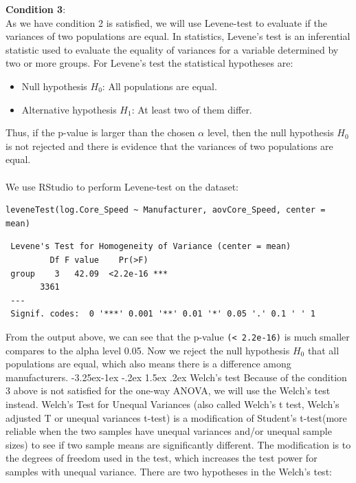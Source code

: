 \documentclass[a4paper]{article}
\makeatletter
\newcounter {subsubsubsection}[subsubsection]
\newcommand\subsubsubsection{\@startsection{subsubsubsection}{4}{\z@}%
                                     {-3.25ex\@plus -1ex \@minus -.2ex}%
                                     {1.5ex \@plus .2ex}%
                                     {\normalfont\normalsize\bfseries}}
\makeatother
\begin{document}
\textbf{Condition 3}:\\
As we have condition 2 is satisfied, we will use Levene-test to evaluate if the variances of two populations are equal. In statistics, Levene’s test is an inferential statistic used to evaluate the equality of variances for a variable determined by two or more groups. For Levene’s test the statistical hypotheses are:
\begin{itemize}
    \item Null hypothesis $H_0$: All populations are equal.
    \item Alternative hypothesis $H_1$: At least two of them differ.
\end{itemize}
Thus, if the p-value is larger than the chosen $\alpha$ level, then the null hypothesis $H_0$ is not rejected and there is evidence that the variances of two populations are equal.\\\\
We use RStudio to perform Levene-test on the dataset:
\begin{mdframed}[leftline=false,rightline=false,backgroundcolor=lightblue!10,nobreak=false]
    \begin{verbatim}
leveneTest(log.Core_Speed ~ Manufacturer, aovCore_Speed, center = mean)
    \end{verbatim}
\end{mdframed}
\begin{lstlisting}
 Levene's Test for Homogeneity of Variance (center = mean)
         Df F value    Pr(>F)    
 group    3   42.09  <2.2e-16 ***
       3361                      
 ---
 Signif. codes:  0 '***' 0.001 '**' 0.01 '*' 0.05 '.' 0.1 ' ' 1
\end{lstlisting}
From the output above, we can see that the p-value \verb|(< 2.2e-16)| is much smaller compares to the alpha level 0.05. Now we reject the null hypothesis $H_0$ that all populations are equal, which also means there is a difference among manufacturers.
\subsubsubsection{Welch’s test}
Because of the condition 3 above is not satisfied for the one-way ANOVA, we will use the Welch’s test instead. Welch’s Test for Unequal Variances (also called Welch’s t test, Welch’s adjusted T or unequal variances t-test) is a modification of Student’s t-test(more reliable when the two samples have unequal variances and/or unequal sample sizes) to see if two sample means are significantly different. The modification is to the degrees of freedom used in the test, which increases the test power for samples with unequal variance. There are two hypotheses in the Welch’s test:
\end{document}

